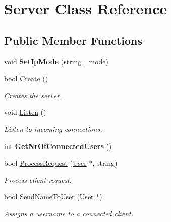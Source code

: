 \hypertarget{class_server}{}\section{Server Class Reference}
\label{class_server}
\subsection*{Public Member Functions}
\begin{DoxyCompactItemize}
\item 
\mbox{\label{class_server_a53978100fb52a5ffdb82e86c048937bd}} 
void {\bfseries Set\+Ip\+Mode} (string \+\_\+mode)
\item 
bool \mbox{\hyperlink{class_server_a8939cd9f717bb164399d1bc9f20a51a2}{Create}} ()
\begin{DoxyCompactList}\small\item\em Creates the server. \end{DoxyCompactList}\item 
\mbox{\label{class_server_afe47ec998069be828fb082e92836c05b}} 
void \mbox{\hyperlink{class_server_afe47ec998069be828fb082e92836c05b}{Listen}} ()
\begin{DoxyCompactList}\small\item\em Listen to incoming connections. \end{DoxyCompactList}\item 
\mbox{\label{class_server_aa55bc2a07c61edd701250603c0264d43}} 
int {\bfseries Get\+Nr\+Of\+Connected\+Users} ()
\item 
bool \mbox{\hyperlink{class_server_a8bf9735f86a6e7ec34ff0547388b7481}{Process\+Request}} (\mbox{\hyperlink{class_user}{User}} $\ast$, string)
\begin{DoxyCompactList}\small\item\em Process client request. \end{DoxyCompactList}\item 
bool \mbox{\hyperlink{class_server_ae46ab3bded0899d34fc891a42057ed0a}{Send\+Name\+To\+User}} (\mbox{\hyperlink{class_user}{User}} $\ast$)
\begin{DoxyCompactList}\small\item\em Assigns a username to a connected client. \end{DoxyCompactList}\item 

\end{DoxyCompactItemize}
